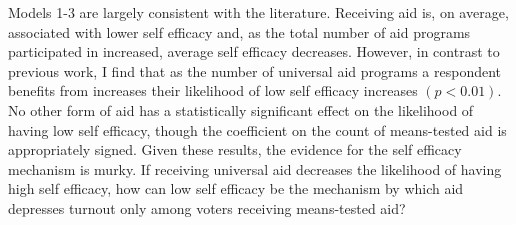 \documentclass[12pt]{paper}
\begin{document}
Models 1-3 are largely consistent with the literature. Receiving aid is, on average, associated with lower self efficacy and, as the total number of aid programs participated in increased, average self efficacy decreases. However, in contrast to previous work, I find that as the number of universal aid programs a respondent benefits from increases their likelihood of low self efficacy increases $(p < 0.01)$. No other form of aid has a statistically significant effect on the likelihood of having low self efficacy, though the coefficient on the count of means-tested aid is appropriately signed. Given these results, the evidence for the self efficacy mechanism is murky. If receiving universal aid decreases the likelihood of having high self efficacy, how can low self efficacy be the mechanism by which aid depresses turnout only among voters receiving means-tested aid?
\end{document}
